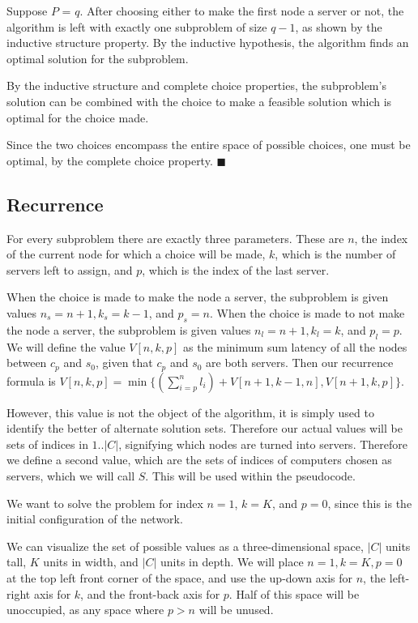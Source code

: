 \documentclass[11pt]{article}
\begin{document}
Suppose $P$ = $q$. After choosing either to make the first node a server or not, the algorithm is left with exactly one subproblem of size $q-1$, as shown by the inductive structure property. By the inductive hypothesis, the algorithm finds an optimal solution for the subproblem.

By the inductive structure and complete choice properties, the subproblem's solution can be combined with the choice to make a feasible solution which is optimal for the choice made.

Since the two choices encompass the entire space of possible choices, one must be optimal, by the complete choice property. $\blacksquare$


\subsection*{Recurrence}

For every subproblem there are exactly three parameters. These are $n$, the index of the current node for which a choice will be made, $k$, which is the number of servers left to assign, and $p$, which is the index of the last server.

When the choice is made to make the node a server, the subproblem is given values $n_s = n+1, k_s = k - 1$, and $p_s = n$. When the choice is made to not make the node a server, the subproblem is given values $n_l = n+1, k_l = k$, and $p_l = p$. We will define the value $V[n, k, p]$ as the minimum sum latency of all the nodes between $c_p$ and $s_0$, given that $c_p$ and $s_0$ are both servers. Then our recurrence formula is $V[n, k, p] = \min\{(\sum_{i=p}^n l_i) + V[n+1, k-1, n], V[n+1, k, p]\}$. 

However, this value is not the object of the algorithm, it is simply used to identify the better of alternate solution sets. Therefore our actual values will be sets of indices in $1..|C|$, signifying which nodes are turned into servers. Therefore we define a second value, which are the sets of indices of computers chosen as servers, which we will call $S$. This will be used within the pseudocode.

We want to solve the problem for index $n=1$, $k = K$, and $p = 0$, since this is the initial configuration of the network. 

We can visualize the set of possible values as a three-dimensional space, $|C|$ units tall, $K$ units in width, and $|C|$ units in depth. We will place $n=1, k=K, p=0$ at the top left front corner of the space, and use the up-down axis for $n$, the left-right axis for $k$, and the front-back axis for $p$. Half of this space will be unoccupied, as any space where $p > n$ will be unused.
\end{document}
